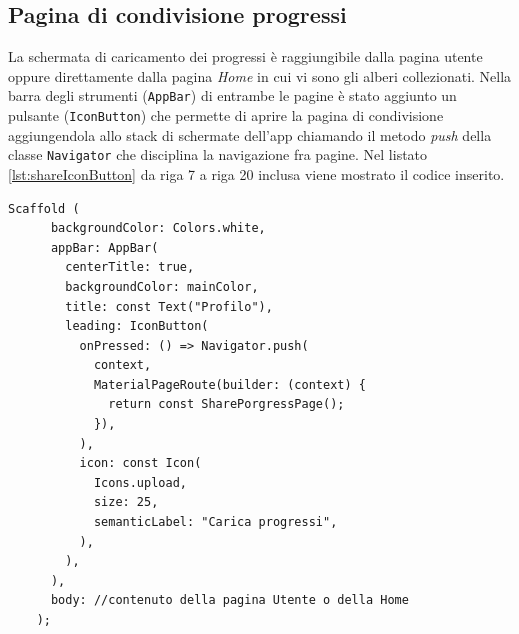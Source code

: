 \subsection{Pagina di condivisione progressi}
La schermata di caricamento dei progressi è raggiungibile dalla pagina utente oppure direttamente dalla pagina \textit{Home} in cui vi sono gli alberi collezionati. Nella barra degli strumenti (\texttt{AppBar}) di entrambe le pagine è stato aggiunto un pulsante (\texttt{IconButton}) che permette di aprire la pagina di condivisione aggiungendola allo stack di schermate dell'app chiamando il metodo \textit{push} della classe \texttt{Navigator} che disciplina la navigazione fra pagine. Nel listato \ref{lst:shareIconButton} da riga 7 a riga 20 inclusa viene mostrato il codice inserito.

\begin{lstlisting}[style=FlutterStyle, caption={Codice aggiornato della barra degli strumenti dell'app: inserito pulsante per la condivisione dei progressi.}, label={lst:shareIconButton}]
    Scaffold (
      backgroundColor: Colors.white,
      appBar: AppBar(
        centerTitle: true,
        backgroundColor: mainColor, 
        title: const Text("Profilo"),
        leading: IconButton(
          onPressed: () => Navigator.push(
            context,
            MaterialPageRoute(builder: (context) {
              return const SharePorgressPage();
            }),
          ),
          icon: const Icon(
            Icons.upload,
            size: 25,
            semanticLabel: "Carica progressi",
          ),
        ),
      ),
      body: //contenuto della pagina Utente o della Home
    );
\end{lstlisting}
